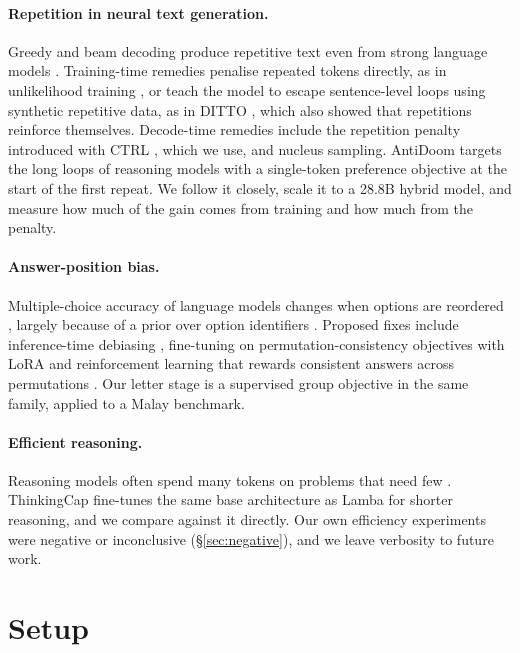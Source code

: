 \documentclass[11pt]{article}
\begin{document}
\paragraph{Repetition in neural text generation.} Greedy and beam decoding produce repetitive text even from strong language models \citep{holtzman2020degeneration}. Training-time remedies penalise repeated tokens directly, as in unlikelihood training \citep{welleck2020unlikelihood}, or teach the model to escape sentence-level loops using synthetic repetitive data, as in DITTO \citep{xu2022ditto}, which also showed that repetitions reinforce themselves. Decode-time remedies include the repetition penalty introduced with CTRL \citep{keskar2019ctrl}, which we use, and nucleus sampling. AntiDoom \citep{liquid2025antidoom} targets the long loops of reasoning models with a single-token preference objective at the start of the first repeat. We follow it closely, scale it to a 28.8B hybrid model, and measure how much of the gain comes from training and how much from the penalty.

\paragraph{Answer-position bias.} Multiple-choice accuracy of language models changes when options are reordered \citep{pezeshkpour2024order}, largely because of a prior over option identifiers \citep{zheng2024pride}. Proposed fixes include inference-time debiasing \citep{zheng2024pride}, fine-tuning on permutation-consistency objectives with LoRA \citep{lora1_pbm} and reinforcement learning that rewards consistent answers across permutations \citep{pagrpo}. Our letter stage is a supervised group objective in the same family, applied to a Malay benchmark.

\paragraph{Efficient reasoning.} Reasoning models often spend many tokens on problems that need few \citep{chen2024overthinking}. ThinkingCap \citep{thinkingcap} fine-tunes the same base architecture as Lamba for shorter reasoning, and we compare against it directly. Our own efficiency experiments were negative or inconclusive (\S\ref{sec:negative}), and we leave verbosity to future work.

\section{Setup}
\end{document}
